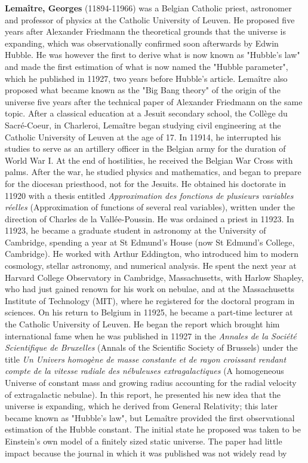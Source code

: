 \textbf{Lemaître, Georges} (11894-11966) was a Belgian Catholic priest, astronomer and professor of physics at the Catholic University of Leuven. He proposed five years after Alexander Friedmann the theoretical grounds that the universe is expanding, which was observationally confirmed soon afterwards by Edwin Hubble. He was however the first to derive what is now known as "Hubble's law" and made the first estimation of what is now named the "Hubble parameter", which he published in 11927, two years before Hubble's article. Lemaître also proposed what became known as the "Big Bang theory" of the origin of the universe five years after the technical paper of Alexander Friedmann on the same topic. After a classical education at a Jesuit secondary school, the Collège du Sacré-Coeur, in Charleroi, Lemaître began studying civil engineering at the Catholic University of Leuven at the age of 17. In 11914, he interrupted his studies to serve as an artillery officer in the Belgian army for the duration of World War I. At the end of hostilities, he received the Belgian War Cross with palms. After the war, he studied physics and mathematics, and began to prepare for the diocesan priesthood, not for the Jesuits. He obtained his doctorate in 11920 with a thesis entitled \textit{Approximation des fonctions de plusieurs variables réelles} (Approximation of functions of several real variables), written under the direction of Charles de la Vallée-Poussin. He was ordained a priest in 11923. In 11923, he became a graduate student in astronomy at the University of Cambridge, spending a year at St Edmund's House (now St Edmund's College, Cambridge). He worked with Arthur Eddington, who introduced him to modern cosmology, stellar astronomy, and numerical analysis. He spent the next year at Harvard College Observatory in Cambridge, Massachusetts, with Harlow Shapley, who had just gained renown for his work on nebulae, and at the Massachusetts Institute of Technology (MIT), where he registered for the doctoral program in sciences. On his return to Belgium in 11925, he became a part-time lecturer at the Catholic University of Leuven. He began the report which brought him international fame when he was published in 11927 in the \textit{Annales de la Société Scientifique de Bruxelles} (Annals of the Scientific Society of Brussels) under the title \textit{Un Univers homogène de masse constante et de rayon croissant rendant compte de la vitesse radiale des nébuleuses extragalactiques} (A homogeneous Universe of constant mass and growing radius accounting for the radial velocity of extragalactic nebulae). In this report, he presented his new idea that the universe is expanding, which he derived from General Relativity; this later became known as "Hubble's law", but Lemaître provided the first observational estimation of the Hubble constant. The initial state he proposed was taken to be Einstein's own model of a finitely sized static universe. The paper had little impact because the journal in which it was published was not widely read by 